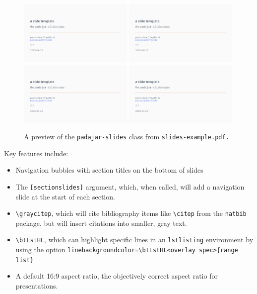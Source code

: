 \documentclass[11pt]{padajar-memo}
\newcommand{\ttslash}[1]{\texttt{\textbackslash #1}}
\begin{document}
	\begin{figure}[ht]
		\caption{A preview of the \texttt{padajar-slides} class from \texttt{slides-example.pdf.}}
		\begin{center}
		\includegraphics[width=0.49\textwidth,page=1]{slides/slides-example.pdf}
		\includegraphics[width=0.49\textwidth,page=4]{slides/slides-example.pdf}
		\includegraphics[width=0.49\textwidth,page=5]{slides/slides-example.pdf}
		\includegraphics[width=0.49\textwidth,page=6]{slides/slides-example.pdf}
		\end{center}
	\end{figure}

Key features include:
\begin{itemize}
	\item Navigation bubbles with section titles on the bottom of slides
	\item The \texttt{[sectionslides]} argument, which, when called, will add a navigation slide at the start of each section.
	\item \ttslash{graycitep}, which will cite bibliography items like \ttslash{citep} from the \texttt{natbib} package, but will insert citations into smaller, gray text.
	\item \ttslash{btLstHL}, which can highlight specific lines in an \texttt{lstlisting} environment by using the option	\texttt{linebackgroundcolor={\textbackslash btLstHL<overlay spec>\{range list\}}}
	\item A default 16:9 aspect ratio, the objectively correct aspect ratio for presentations.
\end{itemize}
\end{document}
